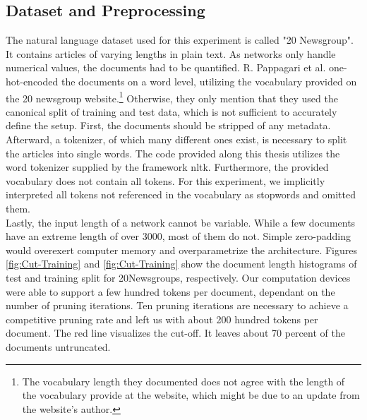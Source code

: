 \subsection*{Dataset and Preprocessing}
The natural language dataset used for this experiment is called "20 Newsgroup". It contains articles of varying lengths in plain text. As networks only handle numerical values, the documents had to be quantified. R. Pappagari et al. one-hot-encoded the documents on a word level, utilizing the vocabulary provided on the 20 newsgroup website.\footnote{
	The vocabulary length they documented does not agree with the length of the vocabulary provide at the website, which might be due to an update from the website's author. 
}\cite{End-to-End-CNN} 
Otherwise, they only mention that they used the canonical split of training and test data, which is not sufficient to accurately define the setup. First, the documents should be stripped of any metadata. Afterward, a tokenizer, of which many different ones exist, is necessary to split the articles into single words. The code provided along this thesis utilizes the word tokenizer supplied by the framework nltk. Furthermore, the provided vocabulary does not contain all tokens. For this experiment, we implicitly interpreted all tokens not referenced in the vocabulary as stopwords and omitted them.\\
Lastly, the input length of a network cannot be variable. While a few documents have an extreme length of over 3000, most of them do not. Simple zero-padding would overexert computer memory and overparametrize the architecture. Figures \ref{fig:Cut-Training} and \ref{fig:Cut-Training} show the document length histograms of test and training split for 20Newsgroups, respectively. Our computation devices were able to support a few hundred tokens per document, dependant on the number of pruning iterations. Ten pruning iterations are necessary to achieve a competitive pruning rate and left us with about 200 hundred tokens per document. The red line visualizes the cut-off. It leaves about 70 percent of the documents untruncated.

